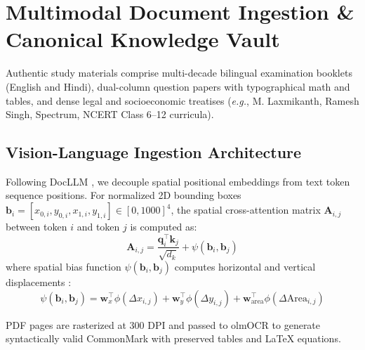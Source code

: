 \documentclass[conference]{IEEEtran}
\begin{document}
\section{Multimodal Document Ingestion \& Canonical Knowledge Vault}
Authentic study materials comprise multi-decade bilingual examination booklets (English and Hindi), dual-column question papers with typographical math and tables, and dense legal and socioeconomic treatises (\textit{e.g.}, M. Laxmikanth, Ramesh Singh, Spectrum, NCERT Class 6--12 curricula).

\subsection{Vision-Language Ingestion Architecture}
Following DocLLM \cite{Wang2024}, we decouple spatial positional embeddings from text token sequence positions. For normalized 2D bounding boxes $\mathbf{b}_i = [x_{0,i}, y_{0,i}, x_{1,i}, y_{1,i}] \in [0, 1000]^4$, the spatial cross-attention matrix $\mathbf{A}_{i,j}$ between token $i$ and token $j$ is computed as:
\begin{equation}
    \mathbf{A}_{i,j} = \frac{\mathbf{q}_i^\top \mathbf{k}_j}{\sqrt{d_k}} + \psi(\mathbf{b}_i, \mathbf{b}_j)
    \label{eq:spatial_attention}
\end{equation}
where spatial bias function $\psi(\mathbf{b}_i, \mathbf{b}_j)$ computes horizontal and vertical displacements \cite{Wang2024,Zhang2024}:
\begin{equation}
    \psi(\mathbf{b}_i, \mathbf{b}_j) = \mathbf{w}_x^\top \phi\left(\Delta x_{i,j}\right) + \mathbf{w}_y^\top \phi\left(\Delta y_{i,j}\right) + \mathbf{w}_{\text{area}}^\top \phi\left(\Delta \text{Area}_{i,j}\right)
    \label{eq:spatial_bias}
\end{equation}

PDF pages are rasterized at $300\text{ DPI}$ and passed to olmOCR \cite{Poznanski2025} to generate syntactically valid CommonMark with preserved tables and LaTeX equations.
\end{document}
